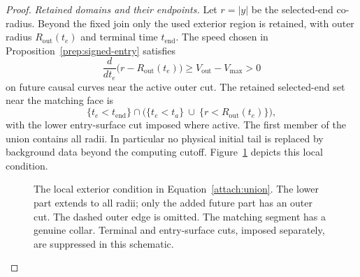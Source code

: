 \begin{proof}
\emph{Retained domains and their endpoints.}
Let $r=|y|$ be the selected-end co-radius. Beyond the fixed join only
the used exterior region is retained, with outer radius
$R_{\mathrm{out}}(t_e)$ and terminal time $t_{\mathrm{end}}$.
The speed chosen in Proposition~\ref{prep:signed-entry} satisfies
\begin{equation}\label{attach:outer-sign}
 \frac{d}{dt_e}\bigl(r-R_{\mathrm{out}}(t_e)\bigr)
 \ge V_{\mathrm{out}}-V_{\max}>0
\end{equation}
on future causal curves near the active outer cut. The retained
selected-end set near the matching face is
\begin{equation}\label{attach:union}
 \{t_e<t_{\mathrm{end}}\}\cap
 \bigl(\{t_e<t_a\}\ \cup\
       \{r<R_{\mathrm{out}}(t_e)\}\bigr),
\end{equation}
with the lower entry-surface cut imposed where active. The first
member of the union contains all radii. In particular no physical
initial tail is replaced by background data beyond the computing
cutoff. Figure~\ref{attach:union-figure} depicts this local condition.

\begin{figure}[ht]
\centering
{}
\caption{The local exterior condition in Equation~\eqref{attach:union}.
The lower part extends to all radii; only the added future part has
an outer cut. The dashed outer edge is omitted. The matching segment
has a genuine collar. Terminal and entry-surface cuts, imposed
separately, are suppressed in this schematic.}
\label{attach:union-figure}
\end{figure}


\end{proof}
